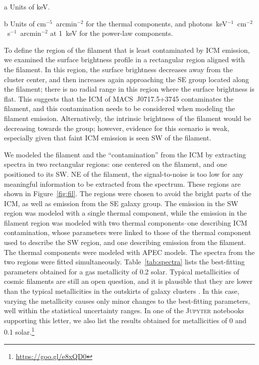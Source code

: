 \begin{table}
\begin{center}
\begin{threeparttable}
\begin{tabular}{l c c}
      \end{tabular}
      \begin{tablenotes}
              \item[a] Units of keV.
              \item[b] Units of cm$^{-5}$~arcmin$^{-2}$ for the thermal components, and photons~keV$^{-1}$~cm$^{-2}$~s$^{-1}$~arcmin$^{-2}$ at 1~keV for the power-law components.
      \end{tablenotes}
    \end{threeparttable}
  \end{center}
\end{table}

To define the region of the filament that is least contaminated by ICM emission, we examined the surface brightness profile in a rectangular region aligned with the filament. In this region, the surface brightness decreases away from the cluster center, and then increases again approaching the SE group located along the filament; there is no radial range in this region where the surface brightness is flat. This suggests that the ICM of MACS~J0717.5+3745 contaminates the filament, and this contamination needs to be considered when modeling the filament emission. Alternatively, the intrinsic brightness of the filament would be decreasing towards the group; however, evidence for this scenario is weak, especially given that faint ICM emission is seen SW of the filament.

We modeled the filament and the ``contamination'' from the ICM by extracting spectra in two rectangular regions: one centered on the filament, and one positioned to its SW. NE of the filament, the signal-to-noise is too low for any meaningful information to be extracted from the spectrum. These regions are shown in Figure~\ref{fig:fil}. The regions were chosen to avoid the bright parts of the ICM, as well as emission from the SE galaxy group. The emission in the SW region was modeled with a single thermal component, while the emission in the filament region was modeled with two thermal components--one describing ICM contamination, whose parameters were linked to those of the thermal component used to describe the SW region, and one describing emission from the filament. The thermal components were modeled with APEC models. The spectra from the two regions were fitted simultaneously. Table~\ref{tab:spectra} lists the best-fitting parameters obtained for a gas metallicity of 0.2 solar. Typical metallicities of cosmic filaments are still an open question, and it is plausible that they are lower than the typical metallicities in the outskirts of galaxy clusters \citep[$\sim 0.2-0.3$ solar; e.g.][]{Simionescu2015}. In this case, varying the metallicity causes only minor changes to the best-fitting parameters, well within the statistical uncertainty ranges. In one of the \textsc{Jupyter} notebooks supporting this letter, we also list the results obtained for metallicities of 0 and 0.1 solar.\footnote{\url{https://goo.gl/e8xQD0}}

